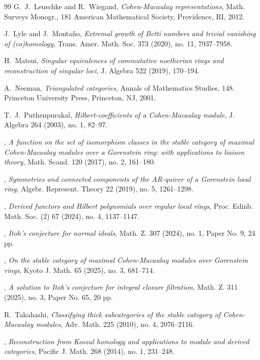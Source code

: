 \documentclass{amsart}
\theoremstyle{plain}
\theoremstyle{definition}
\theoremstyle{remark}
\begin{document}
{\begin{thebibliography} {99}
G.~J.~Leuschke and  R.~Wiegand,
\emph{Cohen-Macaulay representations},
Math. Surveys Monogr., 181
American Mathematical Society, Providence, RI, 2012.

J.~Lyle and J.~Monta\~no,
\emph{Extremal growth of Betti numbers and trivial vanishing of (co)homology},
Trans. Amer. Math. Soc. 373 (2020), no. 11, 7937--7958.

H.~Matsui,
\emph{Singular equivalences of commutative noetherian rings and reconstruction of singular loci},
J. Algebra 522 (2019), 170–194.

 A.~Neeman,
\emph{Triangulated categories},
 Annals of Mathematics Studies, 148. Princeton University Press, Princeton, NJ, 2001.

T.~J.~Puthenpurakal,
\emph{Hilbert-coefficients of a Cohen-Macaulay module},
J. Algebra 264 (2003), no. 1, 82--97.

\bysame,
\emph{A function on the set of isomorphism classes in the stable category of maximal Cohen-Macaulay modules over a Gorenstein ring: with applications to liaison theory},
Math. Scand. 120 (2017), no. 2, 161--180.

\bysame,
\emph{Symmetries and connected components of the AR-quiver of a Gorenstein local ring},
Algebr. Represent. Theory 22 (2019), no. 5, 1261--1298.

\bysame,
\emph{Derived functors and Hilbert polynomials over regular local rings},
Proc. Edinb. Math. Soc. (2) 67 (2024), no. 4, 1137--1147.

\bysame,
\emph{Itoh's conjecture for normal ideals},
Math. Z. 307 (2024), no. 1, Paper No. 9, 24 pp.

\bysame,
\emph{On the stable category of maximal Cohen-Macaulay modules over Gorenstein rings},
Kyoto J. Math. 65 (2025), no. 3, 681–714.

\bysame,
\emph{A solution to Itoh's conjecture for integral closure filtration},
Math. Z. 311 (2025), no. 3, Paper No. 65, 20 pp.




 R.~Takahashi,
 \emph{Classifying thick subcategories of the stable category of Cohen-Macaulay modules},
Adv. Math. 225 (2010), no. 4, 2076--2116.

\bysame,
 \emph{Reconstruction from Koszul homology and applications to module and derived categories},
 Pacific J. Math. 268 (2014), no. 1, 231--248.


\end{thebibliography}}
\end{document}
